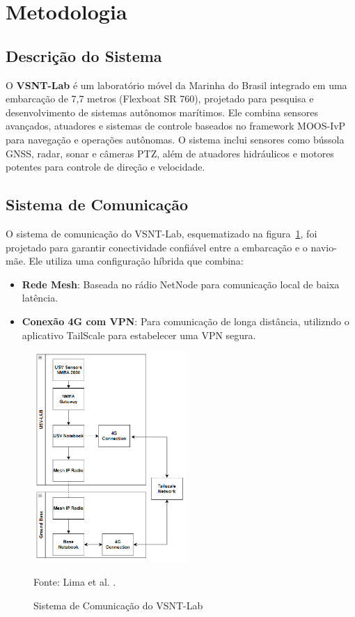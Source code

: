 \section{Metodologia}

\subsection{Descrição do Sistema}
O \textbf{VSNT-Lab} é um laboratório móvel da Marinha do Brasil integrado em uma embarcação de 7,7 metros (Flexboat SR 760), projetado para pesquisa e desenvolvimento de sistemas autônomos marítimos. Ele combina sensores avançados, atuadores e sistemas de controle baseados no framework MOOS-IvP para navegação e operações autônomas. O sistema inclui sensores como bússola GNSS, radar, sonar e câmeras PTZ, além de atuadores hidráulicos e motores potentes para controle de direção e velocidade.

\subsection*{Sistema de Comunicação}
O sistema de comunicação do VSNT-Lab, esquematizado na figura~\ref{fig:meto_vsntNetwork}, foi projetado para garantir conectividade confiável entre a embarcação e o navio-mãe. Ele utiliza uma configuração híbrida que combina:
\begin{itemize}
    \item \textbf{Rede Mesh}: Baseada no rádio NetNode para comunicação local de baixa latência.
    \item \textbf{Conexão 4G com VPN}: Para comunicação de longa distância, utilizndo o aplicativo TailScale para estabelecer uma VPN segura.
\end{itemize}

\begin{figure}[H]
    \caption{Sistema de Comunicação do VSNT-Lab}
       \centering
       \includegraphics[height=8cm]{figuras/meto_vsntNetwork.png}
       \label{fig:meto_vsntNetwork}
   \small
   
   Fonte: Lima et al. \cite{VSNT_douglas2024}.
   \end{figure}

